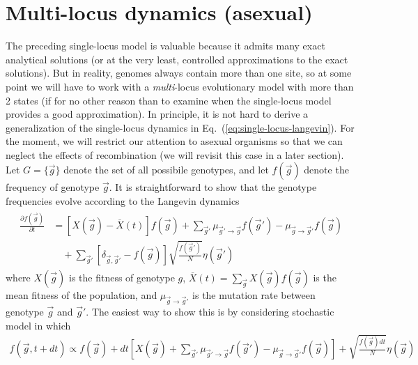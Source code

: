 \documentclass[11pt]{article}
\newcommand{\eq}[1]{Eq.~(\ref{#1})}
\begin{document}
\section{Multi-locus dynamics (asexual)}

The preceding single-locus model is valuable because it admits many exact analytical solutions (or at the very least, controlled approximations to the exact solutions). But in reality, genomes always contain more than one site, so at some point we will have to work with a \emph{multi}-locus evolutionary model with more than 2 states (if for no other reason than to examine when the single-locus model provides a good approximation). In principle, it is not hard to derive a generalization of the single-locus dynamics in \eq{eq:single-locus-langevin}. For the moment, we will restrict our attention to asexual organisms so that we can neglect the effects of recombination (we will revisit this case in a later section). Let $G = \{ \vec{g} \}$ denote the set of all possibile genotypes, and let $f(\vec{g})$ denote the frequency of genotype $\vec{g}$. It is straightforward to show that the genotype frequencies evolve according to the Langevin dynamics
\begin{align}
\label{eq:multi-locus-langevin}
\begin{aligned}
\frac{\partial f(\vec{g})}{\partial t} & = \left[ X(\vec{g}) - \overline{X}(t) \right] f(\vec{g}) + \sum_{\vec{g}'} \mu_{\vec{g}' \to \vec{g}} f(\vec{g}') - \mu_{\vec{g} \to \vec{g}'} f(\vec{g}) \\
	& \quad + \sum_{\vec{g}'} \left[ \delta_{\vec{g},\vec{g}'} - f(\vec{g}) \right] \sqrt{\frac{f(\vec{g}')}{N}} \eta(\vec{g}') 
\end{aligned}
\end{align}
where $X(\vec{g})$ is the fitness of genotype $g$, $\overline{X}(t) = \sum_{\vec{g}} X(\vec{g}) f(\vec{g})$ is the mean fitness of the population, and $\mu_{\vec{g} \to \vec{g}'}$ is the mutation rate between genotype $\vec{g}$ and $\vec{g}'$. The easiest way to show this is by considering stochastic model in which
\begin{align}
f(\vec{g},t+dt) \propto f(\vec{g}) + dt \left[ X(\vec{g}) + \sum_{\vec{g}'} \mu_{\vec{g}' \to \vec{g}} f(\vec{g}') - \mu_{\vec{g} \to \vec{g}'} f(\vec{g}) \right] + \sqrt{\frac{f(\vec{g}) dt}{N}} \eta(\vec{g}) 
\end{align}
\end{document}
